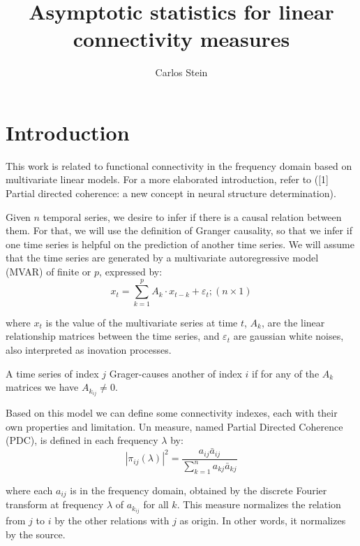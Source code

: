 \documentclass[a4paper,10pt]{article}
\title{Asymptotic statistics for linear connectivity measures}
\author{Carlos Stein}
\begin{document}
\maketitle

\begin{abstract}

\end{abstract}

\section{Introduction}

This work is related to functional connectivity in the frequency domain based on multivariate linear models. For a more elaborated introduction, refer to ([1] Partial directed coherence: a new concept in neural structure determination).

Given $n$ temporal series, we desire to infer if there is a causal relation between them. For that, we will use the definition of Granger causality, so that we infer if one time series is helpful on the prediction of another time series. We will assume that the time series are generated by a multivariate autoregressive model (MVAR) of finite or $p$, expressed by:
\begin{equation}
x_{t} = \sum_{k=1}^{p}{A_{k}\cdot x_{t-k}} + \varepsilon_{t}; (n \times 1)
\end{equation}

where $x_{t}$  is the value of the multivariate series at time $t$, $A_k$, are the linear relationship matrices between the time series, and $\varepsilon_{t}$ are gaussian white noises, also interpreted as inovation processes.

A time series of index $j$ Grager-causes another of index $i$ if for any of the $A_k$ matrices we have $A_{k_{ij}} \neq 0$.

Based on this model we can define some connectivity indexes, each with their own properties and limitation. Un measure, named Partial Directed Coherence (PDC), is defined in each frequency $\lambda$ by:
\begin{equation}
|\pi_{ij}(\lambda)|^{2} = \frac{a_{ij} \bar{a}_{ij}}{\sum_{k=1}^{n}{a_{kj} \bar{a}_{kj}}}  
\end{equation}

where each $a_{ij}$ is in the frequency domain, obtained by the discrete Fourier transform at frequency $\lambda$ of $a_{k_{ij}}$ for all $k$. This measure normalizes the relation from $j$ to $i$ by the other relations with $j$ as origin. In other words, it normalizes by the source.
\end{document}
